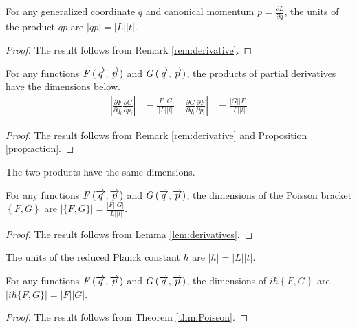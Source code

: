 \begin{proposition}\label{prop:action}
	For any generalized coordinate $q$ and canonical momentum $p = \frac{\partial L}{\partial \dot{q}}$, the units of the product $q p$ are $\left|q p\right| = \left|L\right| \left|t\right|$.
\end{proposition}
\begin{proof}
	The result follows from Remark \ref{rem:derivative}.
\end{proof}

\begin{lemma}\label{lem:derivatives}
	For any functions $F\left(\overrightarrow{q}, \overrightarrow{p}\right)$ and $G\left(\overrightarrow{q}, \overrightarrow{p}\right)$, the products of partial derivatives have the dimensions below.
	\begin{align*}
		\left|\frac{\partial F}{\partial q_i} \frac{\partial G}{\partial p_i}\right| & = \frac{\left|F\right| \left|G\right|}{\left|L\right| \left|t\right|}
		                                                                             &
		\left|\frac{\partial G}{\partial q_i} \frac{\partial F}{\partial p_i}\right| & = \frac{\left|G\right| \left|F\right|}{\left|L\right| \left|t\right|}
	\end{align*}
\end{lemma}
\begin{proof}
	The result follows from Remark \ref{rem:derivative} and Proposition \ref{prop:action}.
\end{proof}

The two products have the same dimensions.

\begin{theorem}\label{thm:Poisson}
	For any functions $F\left(\overrightarrow{q}, \overrightarrow{p}\right)$ and $G\left(\overrightarrow{q}, \overrightarrow{p}\right)$, the dimensions of the Poisson bracket $\left\{F, G\right\}$ are $\left|\{F,G\}\right| = \frac{\left|F\right| \left|G\right|}{\left|L\right| \left|t\right|}$.
\end{theorem}
\begin{proof}
	The result follows from Lemma \ref{lem:derivatives}.
\end{proof}

The units of the reduced Planck constant $\hbar$ are $\left|\hbar\right| = \left|L\right| \left|t\right|$.

\begin{corollary}\label{corl:Poisson}
	For any functions $F\left(\overrightarrow{q}, \overrightarrow{p}\right)$ and $G\left(\overrightarrow{q}, \overrightarrow{p}\right)$, the dimensions of $i \hbar \left\{F, G\right\}$ are $\left|i \hbar \{F,G\}\right| = \left|F\right| \left|G\right|$.
\end{corollary}
\begin{proof}
	The result follows from Theorem \ref{thm:Poisson}.
\end{proof}

